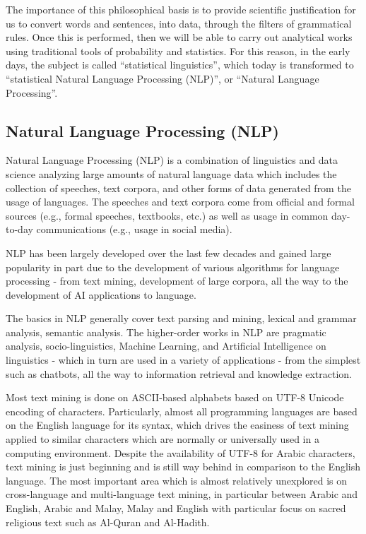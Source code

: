 \documentclass[
]{article}
\begin{document}
The importance of this philosophical basis is to provide scientific justification for us to convert words and sentences, into data, through the filters of grammatical rules. Once this is performed, then we will be able to carry out analytical works using traditional tools of probability and statistics. For this reason, in the early days, the subject is called ``statistical linguistics'', which today is transformed to ``statistical Natural Language Processing (NLP)'', or ``Natural Language Processing''.

\hypertarget{natural-language-processing}{%
\subsection{Natural Language Processing (NLP)}\label{natural-language-processing}}

Natural Language Processing (NLP) is a combination of linguistics and data science analyzing large amounts of natural language data which includes the collection of speeches, text corpora, and other forms of data generated from the usage of languages. The speeches and text corpora come from official and formal sources (e.g., formal speeches, textbooks, etc.) as well as usage in common day-to-day communications (e.g., usage in social media).

NLP has been largely developed over the last few decades and gained large popularity in part due to the development of various algorithms for language processing - from text mining, development of large corpora, all the way to the development of AI applications to language.

The basics in NLP generally cover text parsing and mining, lexical and grammar analysis, semantic analysis. The higher-order works in NLP are pragmatic analysis, socio-linguistics, Machine Learning, and Artificial Intelligence on linguistics - which in turn are used in a variety of applications - from the simplest such as chatbots, all the way to information retrieval and knowledge extraction.

Most text mining is done on ASCII-based alphabets based on UTF-8 Unicode encoding of characters. Particularly, almost all programming languages are based on the English language for its syntax, which drives the easiness of text mining applied to similar characters which are normally or universally used in a computing environment. Despite the availability of UTF-8 for Arabic characters, text mining is just beginning and is still way behind in comparison to the English language. The most important area which is almost relatively unexplored is on cross-language and multi-language text mining, in particular between Arabic and English, Arabic and Malay, Malay and English with particular focus on sacred religious text such as Al-Quran and Al-Hadith.
\end{document}
